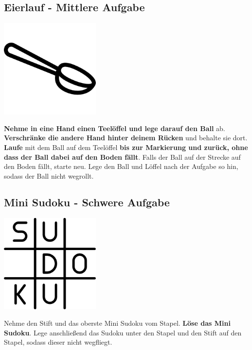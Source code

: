 \subsection{Eierlauf - Mittlere Aufgabe}
\vfill
\begin{center}
    \includegraphics[height=5cm]{graphics/spoon.png}
\end{center}
\vfill
\textbf{Nehme in eine Hand einen Teelöffel und lege darauf den Ball}
ab.
\textbf{Verschränke die andere Hand hinter deinem Rücken} und behalte sie dort.
\textbf{Laufe} mit dem Ball auf dem Teelöffel \textbf{bis zur Markierung und
zurück, ohne dass
der Ball dabei auf den Boden fällt}. Falls der Ball auf der Strecke auf den Boden
fällt, starte neu.
Lege den Ball und Löffel nach der Aufgabe so hin, sodass der Ball nicht
wegrollt.
\newline
\newpage

\subsection{Mini Sudoku - Schwere Aufgabe}
\vfill
\begin{center}
    \includegraphics[height=5cm]{graphics/sudoku.png}
\end{center}
\vfill
Nehme den Stift und das oberste Mini Sudoku vom Stapel.
\textbf{Löse das Mini Sudoku}.
Lege anschließend das Sudoku unter den Stapel und den Stift auf den Stapel,
sodass dieser nicht wegfliegt.
\newline
\newpage
